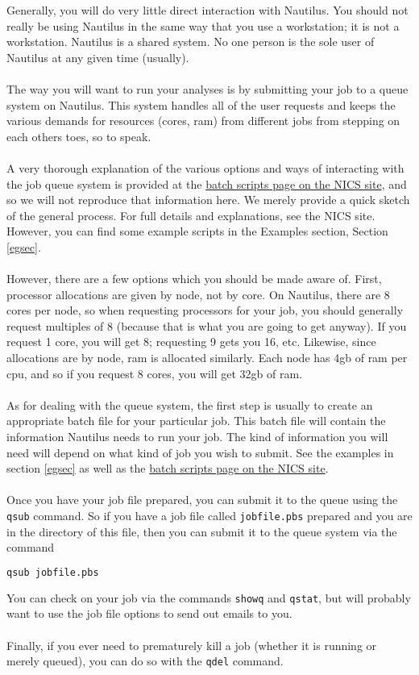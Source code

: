 
\label{jqssec}
Generally, you will do very little direct interaction with Nautilus.  You should not really be using Nautilus in the same way that you use a workstation; it is not a workstation.  Nautilus is a shared system.  No one person is the sole user of Nautilus at any given time (usually).  \\\\
%
The way you will want to run your analyses is by submitting your job to a queue system on Nautilus.  This system handles all of the user requests and keeps the various demands for resources (cores, ram) from different jobs from stepping on each others toes, so to speak.\\\\
%
A very thorough explanation of the various options and ways of interacting with the job queue system is provided at the \href{http://www.nics.tennessee.edu/computing-resources/nautilus/Batch_Scripts}{batch scripts page on the NICS site}, and so we will not reproduce that information here.  We merely provide a quick sketch of the general process.  For full details and explanations, see the NICS site.  However, you can find some example scripts in the Examples section, Section \ref{egsec}.\\\\
%
However, there are a few options which you should be made aware of.  First, processor allocations are given by node, not by core.  On Nautilus, there are 8 cores per node, so when requesting processors for your job, you should generally request multiples of 8 (because that is what you are going to get anyway).  If you request 1 core, you will get 8; requesting 9 gets you 16, etc.  Likewise, since allocations are by node, ram is allocated similarly.  Each node has 4gb of ram per cpu, and so if you request 8 cores, you will get 32gb of ram.\\\\
%
As for dealing with the queue system, the first step is usually to create an appropriate batch file for your particular job.  This batch file will contain the information Nautilus needs to run your job.  The kind of information you will need will depend on what kind of job you wish to submit.  See the examples in section \ref{egsec} as well as the \href{http://www.nics.tennessee.edu/computing-resources/nautilus/Batch_Scripts}{batch scripts page on the NICS site}.\\\\
%
Once you have your job file prepared, you can submit it to the queue using the \texttt{qsub} command.  So if you have a job file called \texttt{jobfile.pbs} prepared and you are in the directory of this file, then you can submit it to the queue system via the command
\begin{lstlisting}[language=sh]
qsub jobfile.pbs 
\end{lstlisting}%
You can check on your job via the commands \texttt{showq} and \texttt{qstat}, but will probably want to use the job file options to send out emails to you.\\\\
%
Finally, if you ever need to prematurely kill a job (whether it is running or merely queued), you can do so with the \texttt{qdel} command.